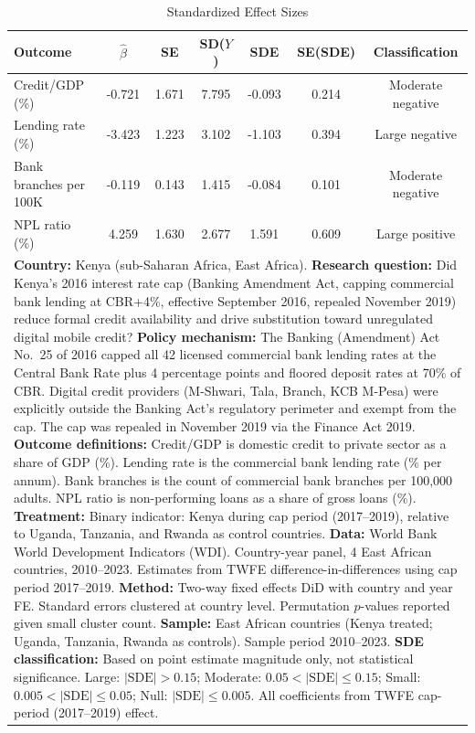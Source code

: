 \begin{table}[htbp]
\centering
\caption{Standardized Effect Sizes}
\label{tab:sde}
\begin{tabular}{lcccccc}
\hline\hline
  Outcome & $\hat{\beta}$ & SE & SD($Y$) & SDE & SE(SDE) & Classification \\
\hline
  Credit/GDP (\%) & -0.721 & 1.671 & 7.795 & -0.093 & 0.214 & Moderate negative \\
  Lending rate (\%) & -3.423 & 1.223 & 3.102 & -1.103 & 0.394 & Large negative \\
  Bank branches per 100K & -0.119 & 0.143 & 1.415 & -0.084 & 0.101 & Moderate negative \\
  NPL ratio (\%) & 4.259 & 1.630 & 2.677 & 1.591 & 0.609 & Large positive \\
\hline\hline
\multicolumn{7}{p{0.98\textwidth}}{\footnotesize
\textbf{Country:} Kenya (sub-Saharan Africa, East Africa).
\textbf{Research question:} Did Kenya's 2016 interest rate cap (Banking Amendment Act, capping commercial bank lending at CBR+4\%, effective September 2016, repealed November 2019) reduce formal credit availability and drive substitution toward unregulated digital mobile credit?
\textbf{Policy mechanism:} The Banking (Amendment) Act No.\ 25 of 2016 capped all 42 licensed commercial bank lending rates at the Central Bank Rate plus 4 percentage points and floored deposit rates at 70\% of CBR. Digital credit providers (M-Shwari, Tala, Branch, KCB M-Pesa) were explicitly outside the Banking Act's regulatory perimeter and exempt from the cap. The cap was repealed in November 2019 via the Finance Act 2019.
\textbf{Outcome definitions:} Credit/GDP is domestic credit to private sector as a share of GDP (\%). Lending rate is the commercial bank lending rate (\% per annum). Bank branches is the count of commercial bank branches per 100,000 adults. NPL ratio is non-performing loans as a share of gross loans (\%).
\textbf{Treatment:} Binary indicator: Kenya during cap period (2017--2019), relative to Uganda, Tanzania, and Rwanda as control countries.
\textbf{Data:} World Bank World Development Indicators (WDI). Country-year panel, 4 East African countries, 2010--2023. Estimates from TWFE difference-in-differences using cap period 2017--2019.
\textbf{Method:} Two-way fixed effects DiD with country and year FE. Standard errors clustered at country level. Permutation $p$-values reported given small cluster count.
\textbf{Sample:} East African countries (Kenya treated; Uganda, Tanzania, Rwanda as controls). Sample period 2010--2023.
\textbf{SDE classification:} Based on point estimate magnitude only, not statistical significance. Large: $|\mathrm{SDE}|>0.15$; Moderate: $0.05<|\mathrm{SDE}|\leq 0.15$; Small: $0.005<|\mathrm{SDE}|\leq 0.05$; Null: $|\mathrm{SDE}|\leq 0.005$. All coefficients from TWFE cap-period (2017--2019) effect.}
\end{tabular}
\end{table}
